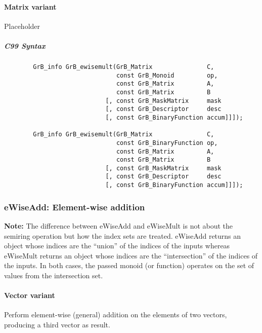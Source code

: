 \paragraph{Matrix variant}

Placeholder



\subparagraph{C99 Syntax}

\begin{verbatim}
        GrB_info GrB_ewisemult(GrB_Matrix               C,
                               const GrB_Monoid         op, 
                               const GrB_Matrix         A,
                               const GrB_Matrix         B
                            [, const GrB_MaskMatrix     mask
                            [, const GrB_Descriptor     desc
                            [, const GrB_BinaryFunction accum]]]);
                            
        GrB_info GrB_ewisemult(GrB_Matrix               C,
                               const GrB_BinaryFunction op, 
                               const GrB_Matrix         A,
                               const GrB_Matrix         B
                            [, const GrB_MaskMatrix     mask
                            [, const GrB_Descriptor     desc
                            [, const GrB_BinaryFunction accum]]]);
\end{verbatim}




\subsubsection{{\sf eWiseAdd}: Element-wise addition}

{\bf Note:} The difference between {\sf eWiseAdd} and {\sf eWiseMult} is not about the semiring operation but how the index sets are treated.
 {\sf eWiseAdd} returns an object whose indices are the ``union'' of the indices of the inputs whereas  
 {\sf eWiseMult} returns an object whose indices are the ``intersection'' of the indices of the inputs. In both cases, the passed monoid (or function) operates on the 
 set of values from the intersection set. 

\paragraph{Vector variant}

Perform element-wise (general) addition on the elements of two vectors,
producing a third vector as result.

